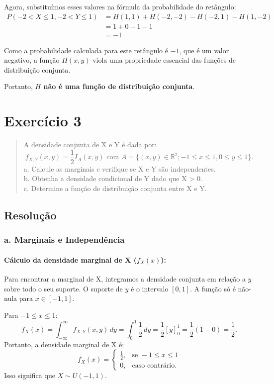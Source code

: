 \documentclass[12pt]{article}
\begin{document}
Agora, substituímos esses valores na fórmula da probabilidade do retângulo:
\begin{align*}
P(-2 < X \le 1, -2 < Y \le 1) &= H(1, 1) + H(-2, -2) - H(-2, 1) - H(1, -2) \\
&= 1 + 0 - 1 - 1 \\
&= -1
\end{align*}

Como a probabilidade calculada para este retângulo é $-1$, que é um valor negativo, a função $H(x,y)$ viola uma propriedade essencial das funções de distribuição conjunta.

Portanto, \textbf{$H$ não é uma função de distribuição conjunta}. \hfill \qedsymbol

\section{Exercício 3}

\begin{quote}
A densidade conjunta de X e Y é dada por:
\[ f_{X,Y}(x,y) = \frac{1}{2} I_A(x,y) \text{ com } A = \{(x,y) \in \mathbb{R}^2; -1 \le x \le 1, 0 \le y \le 1\}. \]
a. Calcule as marginais e verifique se X e Y são independentes. \\
b. Obtenha a densidade condicional de Y dado que X > 0. \\
c. Determine a função de distribuição conjunta entre X e Y.
\end{quote}

\subsection*{Resolução}

\subsubsection*{a. Marginais e Independência}

\paragraph{Cálculo da densidade marginal de X ($f_X(x)$):}
Para encontrar a marginal de X, integramos a densidade conjunta em relação a $y$ sobre todo o seu suporte. O suporte de $y$ é o intervalo $[0, 1]$. A função só é não-nula para $x \in [-1, 1]$.

Para $-1 \le x \le 1$:
\[ f_X(x) = \int_{-\infty}^{\infty} f_{X,Y}(x,y) \,dy = \int_{0}^{1} \frac{1}{2} \,dy = \frac{1}{2} [y]_{0}^{1} = \frac{1}{2}(1-0) = \frac{1}{2}. \]
Portanto, a densidade marginal de X é:
\[ f_X(x) = \begin{cases} \frac{1}{2}, & \text{se } -1 \le x \le 1 \\ 0, & \text{caso contrário.} \end{cases} \]
Isso significa que $X \sim U(-1, 1)$.
\end{document}
